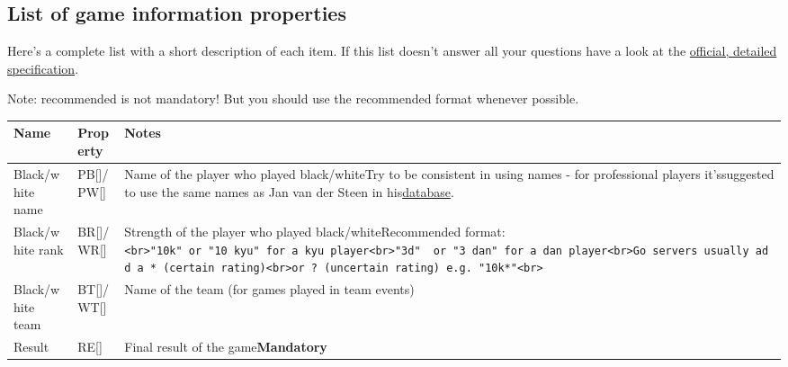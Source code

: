 \subsection{List of game information
properties}\label{list-of-game-information-properties}

Here's a complete list with a short description of each item. If this
list doesn't answer all your questions have a look at the
\href{https://red-bean.com/sgf/properties.html\#AN}{official, detailed
specification}.

Note: recommended is not mandatory! But you should use the recommended
format whenever possible.

{\def\LTcaptype{none} %
\begin{longtable}[]{@{}
  >{\raggedright\arraybackslash}p{}
  >{\raggedright\arraybackslash}p{}
  >{\raggedright\arraybackslash}p{}@{}}
\toprule\noalign{}
\begin{minipage}[b]{\linewidth}\raggedright
Name
\end{minipage} & \begin{minipage}[b]{\linewidth}\raggedright
Property
\end{minipage} & \begin{minipage}[b]{\linewidth}\raggedright
Notes
\end{minipage} \\
\midrule\noalign{}
\endhead
\bottomrule\noalign{}
\endlastfoot
Black/white name & PB{[}{]}/PW{[}{]} & Name of the player who played
black/whiteTry to be consistent in using names - for professional
players it'ssuggested to use the same names as Jan van der Steen in
his\href{http://gobase.org/information/players/browser/}{database}. \\
Black/white rank & BR{[}{]}/WR{[}{]} & Strength of the player who played
black/whiteRecommended
format:\texttt{\textless{}br\textgreater{}"10k"\ or\ "10\ kyu"\ for\ a\ kyu\ player\textless{}br\textgreater{}"3d"\ \ or\ "3\ dan"\ for\ a\ dan\ player\textless{}br\textgreater{}Go\ servers\ usually\ add\ a\ \textasciigrave{}*\textquotesingle{}\ (certain\ rating)\textless{}br\textgreater{}or\ \textasciigrave{}?\textquotesingle{}\ (uncertain\ rating)\ e.g.\ "10k*"\textless{}br\textgreater{}} \\
Black/white team & BT{[}{]}/WT{[}{]} & Name of the team (for games
played in team events) \\
Result & RE{[}{]} & Final result of the game\textbf{Mandatory
}
\end{longtable}}
